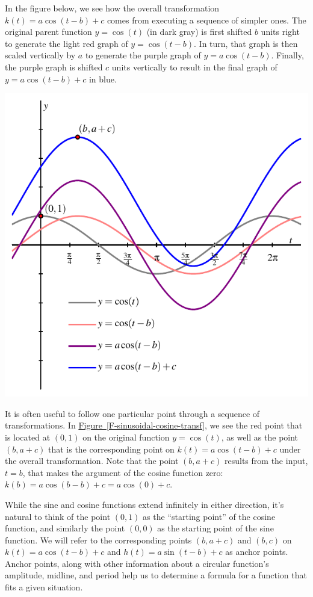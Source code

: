 \documentclass{ximera}
\begin{document}
In the figure below, we see how the overall transformation \(k(t) = a\cos(t-b)+c\) comes from executing a sequence of simpler ones.  The original parent function \(y = \cos(t)\) (in dark gray) is first shifted \(b\) units right to generate the light red graph of \(y = \cos(t - b)\).  In turn, that graph is then scaled vertically by \(a\) to generate the purple graph of \(y = a\cos(t-b)\).  Finally, the purple graph is shifted \(c\) units vertically to result in the final graph of \(y = a\cos(t-b) + c\) in blue.%
\begin{image}
\includegraphics[width=0.8\linewidth]{images/sinusoidal-transformed-cosine}
\end{image}
It is often useful to follow one particular point through a sequence of transformations.  In \hyperref[F-sinusoidal-cosine-transf]{Figure~\ref{F-sinusoidal-cosine-transf}}, we see the red point that is located at \((0,1)\) on the original function \(y = \cos(t)\), as well as the point \((b, a+c)\) that is the corresponding point on \(k(t) = a\cos(t-b) + c\) under the overall transformation.  Note that the point \((b,a+c)\) results from the input, \(t = b\), that makes the argument of the cosine function zero:  \(k(b) = a\cos(b-b) + c = a\cos(0) + c\).%

While the sine and cosine functions extend infinitely in either direction, it's natural to think of the point \((0,1)\) as the ``starting point'' of the cosine function, and similarly the point \((0,0)\) as the starting point of the sine function.  We will refer to the corresponding points \((b,a+c)\) and \((b,c)\) on \(k(t) = a\cos(t-b) + c\) and \(h(t) = a\sin(t-b) + c\) as anchor points. Anchor points, along with other information about a circular function's amplitude, midline, and period help us to determine a formula for a function that fits a given situation.%
\end{document}

